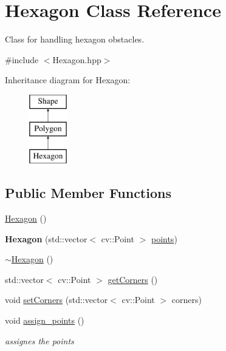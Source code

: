 \hypertarget{class_hexagon}{}\section{Hexagon Class Reference}
\label{class_hexagon}


Class for handling hexagon obstacles.  




{\ttfamily \#include $<$Hexagon.\+hpp$>$}

Inheritance diagram for Hexagon\+:\begin{figure}[H]
\begin{center}
\leavevmode
\includegraphics[height=3.000000cm]{class_hexagon}
\end{center}
\end{figure}
\subsection*{Public Member Functions}
\begin{DoxyCompactItemize}
\item 
\mbox{\hyperlink{class_hexagon_ab503950412a7f11dab9c697c45b614a2}{Hexagon}} ()
\item 
\mbox{\label{class_hexagon_aaed01ef0ea21f3533fcd73a660326ab3}} 
{\bfseries Hexagon} (std\+::vector$<$ cv\+::\+Point $>$ \mbox{\hyperlink{class_polygon_a347474823f6113a34fdefeee276d1b9e}{points}})
\item 
\mbox{\hyperlink{class_hexagon_aaaa69a37657fe47cad3c17d7c3569318}{$\sim$\+Hexagon}} ()
\item 
std\+::vector$<$ cv\+::\+Point $>$ \mbox{\hyperlink{class_hexagon_aa12df068505254931530cbe74ac85ad0}{get\+Corners}} ()
\item 
void \mbox{\hyperlink{class_hexagon_a1b5cdb94637901f346373429660af3b1}{set\+Corners}} (std\+::vector$<$ cv\+::\+Point $>$ corners)
\item 
\mbox{\label{class_hexagon_a59383ce16764b0123ccde0e8db32cf06}} 
void \mbox{\hyperlink{class_hexagon_a59383ce16764b0123ccde0e8db32cf06}{assign\+\_\+points}} ()
\begin{DoxyCompactList}\small\item\em assignes the points \end{DoxyCompactList}\end{DoxyCompactItemize}
